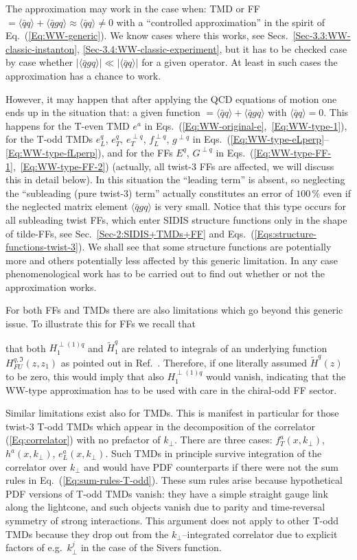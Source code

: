 \documentclass[a4paper,11pt]{article}
\newcommand{\blue}[1]{{\color{blue} #1}}
\newcommand{\la}{\langle}
\newcommand{\ra}{\rangle}
\newcommand{\ps}[1]{\blue{ #1}}
\def\kperp{k_\perp}
\begin{document}
\ps{The approximation may work in the case when: TMD or FF 
$=\la\bar{q}q\ra + \la\bar{q}gq\ra \approx \la\bar{q}q\ra \neq 0$ with 
a ``controlled approximation'' in the spirit of Eq.~(\ref{Eq:WW-generic}).
We know cases where this works, see
Secs.~\ref{Sec-3.3:WW-classic-instanton}, \ref{Sec-3.4:WW-classic-experiment},
but it has to be checked case by case whether
$| \la\bar{q}gq\ra  | \ll  |\la\bar{q}q\ra|$ for a given operator.
At least in such cases the approximation has a chance to work.

However, it may happen that after applying the QCD equations
of motion one ends up in the situation that: a given function 
$=\la\bar{q}q\ra + \la\bar{q}gq\ra$ with $\la\bar{q}q\ra = 0$.
This happens for the T-even TMD 
	$e^a$ in Eqs.~(\ref{Eq:WW-original-e},~\ref{Eq:WW-type-1}), 
for the T-odd TMDs 
	$e_L^q$, 
	$e_T^q$,
	$e_T^{\perp q}$, 
	$f_L^{\perp q}$,
	$g^{\perp q}$ in Eqs.~(\ref{Eq:WW-type-eLperp}--\ref{Eq:WW-type-fLperp}), 
and for the FFs
	$E^q$, 
	$G^{\perp q}$ in Eqs.~(\ref{Eq:WW-type-FF-1},~\ref{Eq:WW-type-FF-2})
(actually, all twist-3 FFs are affected, we will discuss this in detail below). 
In this situation the ``leading term'' is absent, so neglecting the 
``subleading (pure twist-3) term'' actually constitutes an error of $100\,\%$
even if the neglected matrix element  $\la\bar{q}gq\ra$ is very small.
Notice that this type occurs for all subleading twist FFs, which enter 
SIDIS structure functions only in the shape of tilde-FFs, see 
Sec.~\ref{Sec-2:SIDIS+TMDs+FF} and 
Eqs.~(\ref{Eqs:structure-functions-twist-3}). 
We shall see that some structure functions are potentially more and 
others potentially less affected by this generic limitation. In any 
case phenomenological work has to be carried out to find out whether 
or not the approximation works. 


For both FFs and TMDs there are also limitations 
which go beyond this generic issue. To illustrate this for FFs
we recall that} that both $H_1^{\perp(1)q}$ and $\tilde H_1^{q}$ are 
related to integrals of an underlying function $H_{FU}^{q,\Im}(z,z_1)$
as pointed out in Ref.~\cite{Kanazawa:2015ajw}. Therefore, if one 
literally assumed $\tilde H^q(z)$ to be zero, this would imply that 
also $H_1^{\perp(1)q}$ would vanish, indicating that the WW-type 
approximation has to be used with care in the chiral-odd FF sector.

Similar limitations exist also for TMDs. This is manifest in particular 
for those twist-3 T-odd TMDs which appear in the decomposition of the 
correlator (\ref{Eq:correlator}) with no prefactor of $\kperp$.
There are three cases: $f_T^a(x,k_\perp)$, $h^a(x,\kperp)$, $e_L^a(x,\kperp)$.
Such TMDs in principle survive integration of the correlator over $\kperp$
and would have PDF counterparts if there were not the sum rules in 
Eq.~(\ref{Eq:sum-rules-T-odd}). These sum rules arise because hypothetical
PDF versions of T-odd TMDs vanish: they have a simple straight gauge link
along the lightcone, and such objects vanish due to parity and time-reversal 
symmetry of strong interactions. This argument does not apply to other T-odd 
TMDs because they drop out from the $\kperp$--integrated correlator due to 
explicit factors of e.g.\ $\kperp^j$ in the case of the Sivers function.
\end{document}
